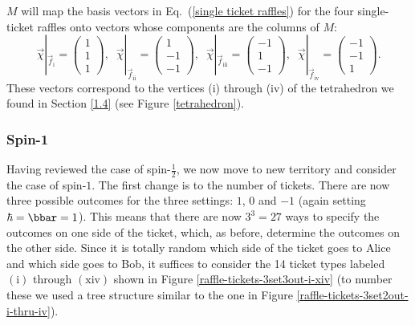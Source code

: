 $M$ will map the basis vectors in Eq.\ (\ref{single ticket raffles}) for the four single-ticket raffles onto vectors whose components are the columns of $M$:
\begin{equation}
\vec{\chi}|_{\vec{f}_{\mathrm{i}}} = 
\begin{pmatrix}
1 \\
1 \\
1
\end{pmatrix},
\;\;
\vec{\chi}|_{\vec{f}_{\mathrm{ii}}} = 
\begin{pmatrix}
1 \\
-1 \\
-1
\end{pmatrix},
\;\;
\vec{\chi}|_{\vec{f}_{\mathrm{iii}}} =
\begin{pmatrix}
-1 \\
1 \\
-1
\end{pmatrix},
\;\;
\vec{\chi}|_{\vec{f}_{\mathrm{iv}}} = 
\begin{pmatrix}
-1 \\
-1 \\
1
\end{pmatrix}.
\label{Mapping spin 1/2 c}
\end{equation}
These vectors correspond to the vertices (i) through (iv) of the tetrahedron we found in Section \ref{1.4} (see Figure \ref{tetrahedron}). 


\subsubsection{Spin-1}  \label{2.2.2}

Having reviewed the case of spin-$\frac12$, we now move to new territory and consider the case of spin-$1$. The first change is to the number of tickets. There are now three possible outcomes for the three settings: $1$, $0$ and $-1$ (again setting $\hbar = \bbar =1$). This means that there are now $3^3=27$ ways to specify the outcomes on one side of the ticket, which, as before, determine the outcomes on the other side. Since it is totally random which side of the ticket goes to Alice and which side goes to Bob, it suffices to consider the 14 ticket types labeled $(\mathrm{i})$ through $(\mathrm{xiv})$ shown in Figure \ref{raffle-tickets-3set3out-i-xiv} (to number these we used a tree structure similar to the one in Figure \ref{raffle-tickets-3set2out-i-thru-iv}). 

